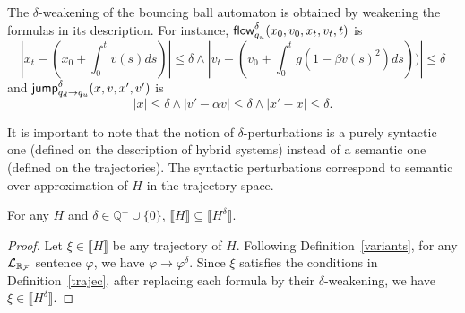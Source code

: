 \documentclass[10pt,envcountsect]{llncs}
\begin{document}
\begin{example}
The $\delta$-weakening of the bouncing ball automaton is obtained by weakening the formulas in its description. For instance, $\mathsf{flow}_{q_u}^{\delta}(x_0, v_0, x_t, v_t, t)$ is
{$$|x_t - (x_0 + \int_0^{t} v(s) ds)|\leq \delta \wedge |v_t - (v_0 + \int_0^t g(1-\beta v(s)^2) ds))|\leq \delta$$}
and $\mathsf{jump}_{q_d \rightarrow q_u}^{\delta} (x, v, x', v')$ is {$$|x|\leq \delta \wedge |v' - \alpha v|\leq \delta \wedge |x'-x|\leq \delta.$$}
\end{example}
\begin{remark} It is important to note that the notion of $\delta$-perturbations is a purely syntactic one (defined on the description of hybrid systems) instead of a semantic one (defined on the trajectories). The syntactic perturbations correspond to semantic over-approximation of $H$ in the trajectory space.
\end{remark}
\begin{proposition} For any $H$ and $\delta\in\mathbb{Q}^+\cup\{0\}$, $\llbracket H\rrbracket\subseteq \llbracket H^{\delta}\rrbracket$.
\end{proposition}
\begin{proof}
Let $\xi\in \llbracket H\rrbracket$ be any trajectory of $H$. Following
Definition~\ref{variants}, for any $\mathcal{L}_{\mathbb{R}_{\mathcal{F}}}$ sentence $\varphi$, we have
$\varphi\rightarrow\varphi^{\delta}$. Since
$\xi$ satisfies the conditions in Definition~\ref{trajec}, after replacing each
formula by their $\delta$-weakening, we have $\xi\in \llbracket H^{\delta}\rrbracket$.
\end{proof}
\end{document}
